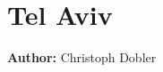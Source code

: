 \section{Tel Aviv}
\label{ch:scenarios:telaviv}
\hfill \textbf{Author:} Christoph Dobler

\citep[][]{BekhorEtAl_TRB_2011}

